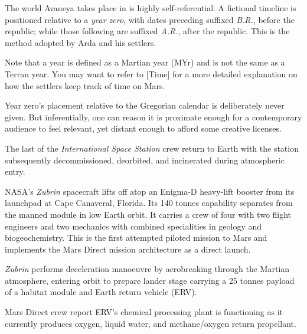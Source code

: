 
\startlines

The world Avaneya takes place in is highly self-referential. A fictional timeline is positioned relative to a {\it year zero}, with dates preceding suffixed {\it B.R.}, before the republic; while those following are suffixed {\it A.R.}, after the republic. This is the method adopted by Arda and his settlers.

Note that a year is defined as a Martian year (MYr) and is not the same as a Terran year. You may want to refer to [Time] for a more detailed explanation on how the settlers keep track of time on Mars.

Year zero's placement relative to the Gregorian calendar is deliberately never given. But inferentially, one can reason it is proximate enough for a contemporary audience to feel relevant, yet distant enough to afford some creative licenses.
\crlf

The last of the {\it International Space Station} crew return to Earth with the station subsequently decommissioned, deorbited, and incinerated during atmospheric entry.
\StopTimelineDate

NASA's {\it Zubrin} spacecraft lifts off atop an Enigma-D heavy-lift booster from its launchpad at Cape Canaveral, Florida. Its 140 tonnes capability separates from the manned module in low Earth orbit. It carries a crew of four with two flight engineers and two mechanics with combined specialities in geology and biogeochemistry. This is the first attempted piloted mission to Mars and implements the Mars Direct mission architecture as a direct launch.
\StopTimelineDate

{\it Zubrin} performs deceleration manoeuvre by aerobreaking through the Martian atmosphere, entering orbit to prepare lander stage carrying a 25 tonnes payload of a habitat module and Earth return vehicle (ERV).
\StopTimelineDate

Mars Direct crew report ERV's chemical processing plant is functioning as it currently produces oxygen, liquid water, and methane/oxygen return propellant.
\StopTimelineDate

